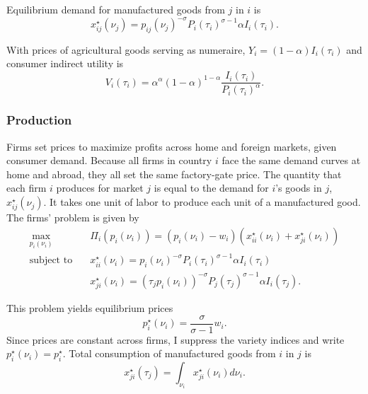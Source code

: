 \documentclass{puthesis}
\begin{document}
Equilibrium demand for manufactured goods from \(j\) in \(i\) is
\begin{equation} \label{eq:demand}
x_{ij}^\star(\nu_j) = p_{ij}(\nu_j)^{-\sigma} P_i(\tau_i)^{\sigma - 1} \alpha I_i(\tau_i) .
\end{equation}

With prices of agricultural goods serving as numeraire,
\(Y_i = (1 - \alpha) I_i(\tau_i)\) and consumer indirect utility is
\begin{equation} \label{eq:V}
V_i(\tau_i) = \alpha^\alpha (1 - \alpha)^{1 - \alpha} \frac{I_i(\tau_i)}{P_i(\tau_i)^\alpha} .
\end{equation}

\subsubsection{Production}

Firms set prices to maximize profits across home and foreign markets,
given consumer demand. Because all firms in country \(i\) face the same
demand curves at home and abroad, they all set the same factory-gate
price. The quantity that each firm \(i\) produces for market \(j\) is
equal to the demand for \(i\)'s goods in \(j\), \(x_{ij}^\star(\nu_j)\).
It takes one unit of labor to produce each unit of a manufactured good.
The firms' problem is given by \begin{equation} \label{eq:Pi}
\begin{split}
\max_{p_i(\nu_i)} & \quad \Pi_i \left( p_i(\nu_i) \right) = \left( p_i(\nu_i) - w_i \right) \left( x_{ii}^\star(\nu_i) + x_{ji}^\star(\nu_i) \right) \\
\text{subject to} & \quad x_{ii}^\star(\nu_i) = p_i(\nu_i)^{-\sigma} P_i(\tau_i)^{\sigma - 1} \alpha I_i(\tau_i) \\
& \quad x_{ji}^\star(\nu_i) = (\tau_j p_i(\nu_i))^{-\sigma} P_j(\tau_j)^{\sigma - 1} \alpha I_i(\tau_j) .
\end{split}
\end{equation}

This problem yields equilibrium prices
\begin{equation} \label{eq:prices}
p_i^\star(\nu_i) = \frac{\sigma}{\sigma - 1} w_i .
\end{equation} Since prices are constant across firms, I suppress the
variety indices and write \(p_i^\star(\nu_i) = p_i^\star\). Total
consumption of manufactured goods from \(i\) in \(j\) is \[
x_{ji}^\star(\tau_j) = \int_{\nu_i} x_{ji}^\star(\nu_i) d \nu_i .
\]
\end{document}
